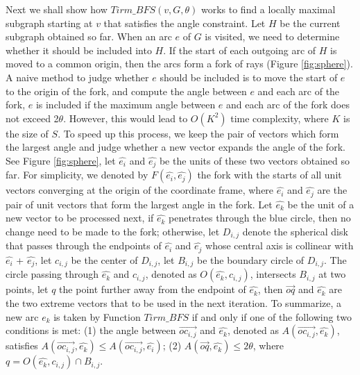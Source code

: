 Next we shall show how $Tirm\_BFS(v, G, \theta)$ works to find a locally maximal subgraph starting at $v$ that satisfies the angle constraint. Let $H$ be the current subgraph obtained so far. When an arc $e$ of $G$ is visited, we need to determine whether it should be included into $H$. If the start of each outgoing arc of $H$ is moved to a common origin, then the arcs form a fork of rays (Figure \ref{fig:sphere}). A naive method to judge whether $e$ should be included is to move the start of $e$ to the origin of the fork, and compute the angle between $e$ and each arc of the fork, $e$ is included if the maximum angle between $e$ and each arc of the fork does not exceed 2$\theta$. However, this would lead to $O(K^{2})$ time complexity, where $K$ is the size of $S$. To speed up this process, we keep the pair of vectors which form the largest angle and judge whether a new vector expands the angle of the fork. See Figure \ref{fig:sphere}, let $\hat{e_i}$  and $\hat{e_j}$ be the units of these two vectors obtained so far. For simplicity, we denoted by $F( \hat{e_i}, \hat{e_j} )$ the fork with the starts of all unit vectors converging at the origin of the coordinate frame, where $\hat{e_i}$  and  $\hat{e_j}$  are the pair of unit vectors that form the largest angle in the fork. Let $\hat{e_k}$  be the unit of a new vector to be processed next, if $\hat{e_k}$ penetrates through the blue circle, then no change need to be made to the fork; otherwise, let $D_{i,j}$ denote the spherical disk that passes through the endpoints of $\hat{e_i}$  and $\hat{e_j}$ whose central axis is collinear with $\hat{e_i}$  + $\hat{e_j}$, let $c_{i,j}$ be the center of $D_{i,j}$, let $B_{i,j}$ be the boundary circle of $D_{i,j}$. The circle passing through $\hat{e_k}$  and $c_{i,j}$, denoted as $O( \hat{e_k}, c_{i,j})$, intersects  $B_{i,j}$ at two points, let $q$ the point further away from the endpoint of $\hat{e_k}$, then $\overrightarrow{oq}$ and $\hat{e_k}$ are the two extreme vectors that to be used in the next iteration. To summarize, a new arc $e_k$ is taken by Function $Tirm\_BFS$ if and only if one of the following two conditions is met:
(1) the angle between $\overrightarrow{oc_{i,j}}$ and $\hat{e_k}$, denoted as $A(\overrightarrow{oc_{i,j}}, \hat{e_k})$, satisfies  $A(\overrightarrow{oc_{i,j}}, \hat{e_k}) \leq A(\overrightarrow{oc_{i,j}}, \hat{e_i})$;
(2) $A(\overrightarrow{oq}, \hat{e_k})  \leq  2\theta$, where $q = O( \hat{e_k}, c_{i,j}) \cap B_{i,j}$.


